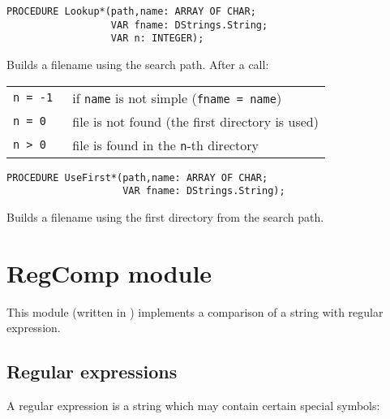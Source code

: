 {\samepage
{}
\begin{verbatim}
PROCEDURE Lookup*(path,name: ARRAY OF CHAR;
                  VAR fname: DStrings.String;
                  VAR n: INTEGER);
\end{verbatim}
}
\ModuleList
Builds a filename using the search path. After a call:
\begin{center}
\begin{tabular}{ll}
\tt n = -1 & if {\tt name} is not simple ({\tt fname = name}) \\
\tt n =  0 & file is not found (the first directory is used)  \\
\tt n >  0 & file is found in the \verb'n'-th directory       \\
\end{tabular}
\end{center}

{\samepage
{}
\begin{verbatim}
PROCEDURE UseFirst*(path,name: ARRAY OF CHAR;
                    VAR fname: DStrings.String);
\end{verbatim}
}
\ModuleList
Builds a filename using the first directory from
the search path.


\section{RegComp module}
\renewcommand{\ModuleI}{RegComp}
\OneModule
{}

This  module (written in \ot{}) implements a comparison of a string with
regular expression.

\subsection{Regular expressions}

A regular expression is a string which may contain certain special symbols:

